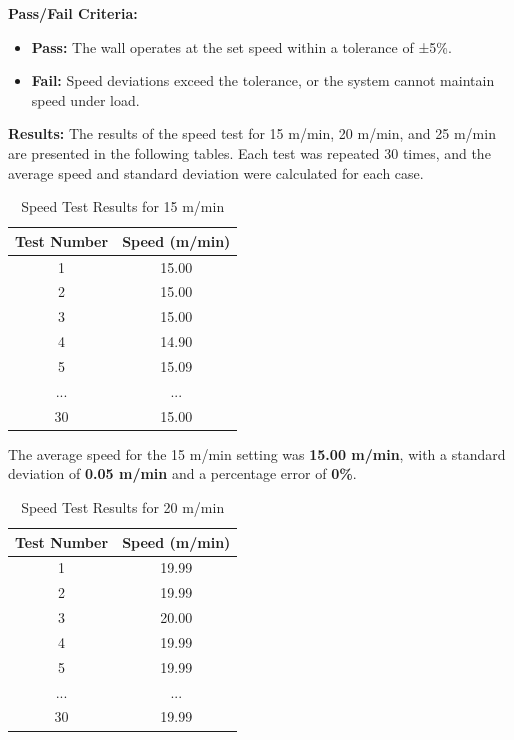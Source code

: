 \textbf{Pass/Fail Criteria:}
\begin{itemize}
    \item \textbf{Pass:} The wall operates at the set speed within a tolerance of ±5\%.
    \item \textbf{Fail:} Speed deviations exceed the tolerance, or the system cannot maintain speed under load.
\end{itemize}

\textbf{Results:}
The results of the speed test for 15 m/min, 20 m/min, and 25 m/min are presented in the following tables. Each test was repeated 30 times, and the average speed and standard deviation were calculated for each case.

\begin{table}[H]
\centering
\caption{Speed Test Results for 15 m/min}
\label{tab:speed_test_15}
\begin{tabular}{|c|c|}
\hline
\textbf{Test Number} & \textbf{Speed (m/min)} \\ \hline
1  & 15.00 \\ \hline
2  & 15.00 \\ \hline
3  & 15.00 \\ \hline
4  & 14.90 \\ \hline
5  & 15.09 \\ \hline
...  & ...  \\ \hline
30 & 15.00 \\ \hline
\end{tabular}
\end{table}

The average speed for the 15 m/min setting was \textbf{15.00 m/min}, with a standard deviation of \textbf{0.05 m/min} and a percentage error of \textbf{0\%}.

\begin{table}[H]
\centering
\caption{Speed Test Results for 20 m/min}
\label{tab:speed_test_20}
\begin{tabular}{|c|c|}
\hline
\textbf{Test Number} & \textbf{Speed (m/min)} \\ \hline
1  & 19.99 \\ \hline
2  & 19.99 \\ \hline
3  & 20.00 \\ \hline
4  & 19.99 \\ \hline
5  & 19.99 \\ \hline
...  & ...  \\ \hline
30 & 19.99 \\ \hline
\end{tabular}
\end{table}

